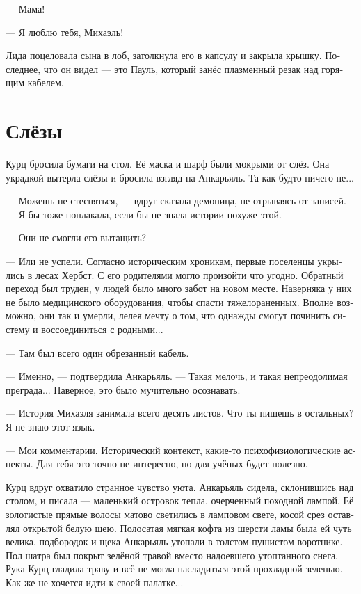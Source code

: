 \documentclass[a4paper,10pt,fleqn]{book}\usepackage{polyglossia}\setdefaultlanguage[babelshorthands=true]{russian}\setotherlanguage{english}\defaultfontfeatures{Ligatures=TeX,Mapping=tex-text}\usepackage{xcolor}\newcommand{\ml}[3]{#2}
\begin{document}
--- Мама!

--- Я люблю тебя, Михаэль!

Лида поцеловала сына в лоб, затолкнула его в капсулу и закрыла крышку.
Последнее, что он видел --- это Пауль, который занёс плазменный резак над горящим кабелем.

\section{Слёзы}

Курц бросила бумаги на стол.
Её маска и шарф были мокрыми от слёз.
Она украдкой вытерла слёзы и бросила взгляд на Анкарьяль.
Та как будто ничего не...

--- Можешь не стесняться, --- вдруг сказала демоница, не отрываясь от записей.
--- Я бы тоже поплакала, если бы не знала истории похуже этой.

--- Они не смогли его вытащить?

--- Или не успели.
Согласно историческим хроникам, первые поселенцы укрылись в лесах Хербст.
С его родителями могло произойти что угодно.
Обратный переход был труден, у людей было много забот на новом месте.
Наверняка у них не было медицинского оборудования, чтобы спасти тяжелораненных.
Вполне возможно, они так и умерли, лелея мечту о том, что однажды смогут починить систему и воссоединиться с родными...

--- Там был всего один обрезанный кабель.

--- Именно, --- подтвердила Анкарьяль.
--- Такая мелочь, и такая непреодолимая преграда...
Наверное, это было мучительно осознавать.

--- История Михаэля занимала всего десять листов.
Что ты пишешь в остальных?
Я не знаю этот язык.

--- Мои комментарии.
Исторический контекст, какие-то психофизиологические аспекты.
Для тебя это точно не интересно, но для учёных будет полезно.

Курц вдруг охватило странное чувство уюта.
Анкарьяль сидела, склонившись над столом, и писала --- маленький островок тепла, очерченный походной лампой.
Её золотистые прямые волосы матово светились в ламповом свете, косой срез оставлял открытой белую шею.
Полосатая мягкая кофта из шерсти ламы была ей чуть велика, подбородок и щека Анкарьяль утопали в толстом пушистом воротнике.
Пол шатра был покрыт зелёной травой вместо надоевшего утоптанного снега.
Рука Курц гладила траву и всё не могла насладиться этой прохладной зеленью.
Как же не хочется идти к своей палатке...
\end{document}
